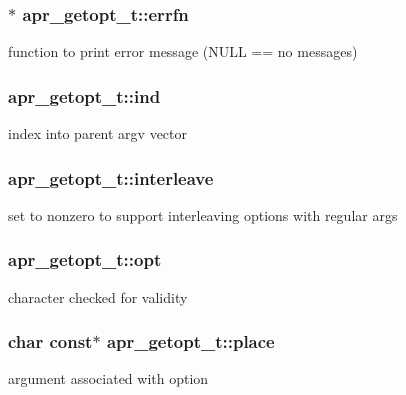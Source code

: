\subsubsection[{\texorpdfstring{errfn}{errfn}}]{$\ast$ apr\+\_\+getopt\+\_\+t\+::errfn}\hypertarget{structapr__getopt__t_a6bf3fd7ad92d1f0161cd895e1ad50d06}{}\label{structapr__getopt__t_a6bf3fd7ad92d1f0161cd895e1ad50d06}
function to print error message (N\+U\+LL == no messages) 
\subsubsection[{\texorpdfstring{ind}{ind}}]{ apr\+\_\+getopt\+\_\+t\+::ind}\hypertarget{structapr__getopt__t_ab04d49d670f095c3244dc9792b70ff07}{}\label{structapr__getopt__t_ab04d49d670f095c3244dc9792b70ff07}
index into parent argv vector 
\subsubsection[{\texorpdfstring{interleave}{interleave}}]{ apr\+\_\+getopt\+\_\+t\+::interleave}\hypertarget{structapr__getopt__t_a771dbef87345c731845dd63723fb34db}{}\label{structapr__getopt__t_a771dbef87345c731845dd63723fb34db}
set to nonzero to support interleaving options with regular args 
\subsubsection[{\texorpdfstring{opt}{opt}}]{ apr\+\_\+getopt\+\_\+t\+::opt}\hypertarget{structapr__getopt__t_a4f842391b8f8f19e562584fdd29d0654}{}\label{structapr__getopt__t_a4f842391b8f8f19e562584fdd29d0654}
character checked for validity 
\subsubsection[{\texorpdfstring{place}{place}}]{\setlength{\rightskip}{0pt plus 5cm}char const$\ast$ apr\+\_\+getopt\+\_\+t\+::place}\hypertarget{structapr__getopt__t_a87961387d1c71bebfbdf69c7f392d2d5}{}\label{structapr__getopt__t_a87961387d1c71bebfbdf69c7f392d2d5}
argument associated with option 
